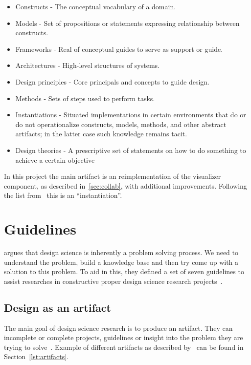 \documentclass[../Main/thesis.tex]{subfiles}
\begin{document}
\begin{itemize}
\caption{Example of artifacts}%
\label{lst:artifacts}
    \item Constructs - The conceptual vocabulary of a domain.
    \item Models - Set of propositions or statements expressing relationship
        between constructs.
    \item Frameworks - Real of conceptual guides to serve as support or guide.
    \item Architectures - High-level structures of systems.
    \item Design principles - Core principals and concepts to guide design.
    \item Methods - Sets of steps used to perform tasks.
    \item Instantiations - Situated implementations in certain environments that do or do not
operationalize constructs, models, methods, and other abstract artifacts; in the
latter case such knowledge remains tacit.
    \item Design theories -  A prescriptive set of statements on how to do something to achieve a certain objective
\end{itemize}

In this project the main artifact is an reimplementation of the visualizer
component, as described in~\ref{sec:collab}, with additional improvements.
Following the list from~\citeauthor{Vaishnavi:2015:DSR:2807332} this is an
``instantiation''.

\section{Guidelines}%
\label{sec:guidelines}
\citeauthor{Hevner:2004:DSI:2017212.2017217} argues that design science is
inherently a problem solving process. We need to understand the problem, build
a knowledge base and then try come up with a solution to this problem. To aid in
this, they defined a set of seven guidelines to assist researches in
constructive proper design science research projects~\cite{Hevner:2004:DSI:2017212.2017217}.

\subsection*{Design as an artifact}%
\label{sub:design_as_an_artifact}
The main goal of design science research is to produce an artifact. They can
incomplete or complete projects, guidelines or insight into the problem they are
trying to solve~\cite{Hevner:2004:DSI:2017212.2017217}. Example of different artifacts as described by~\citeauthor{Vaishnavi:2015:DSR:2807332} can be found in Section~\ref{lst:artifacts}.
\end{document}

